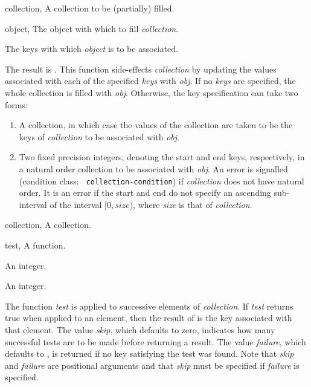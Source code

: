 \begin{optDefinition}
%
\begin{genericargs}
    \item[collection, \classref{collection}] A collection to be (partially) filled.
    \item[object, \classref{object}] The object with which to fill {\em collection}.
    \item[\optional{keys}] The keys with which {\em object\/} is to be
    associated.
\end{genericargs}
%
\result%
The result is \nil.
%
\remarks%
This function side-effects {\em collection\/} by updating the values
associated with each of the specified {\em keys\/} with {\em obj}.  If
no {\em keys\/} are specified, the whole collection is filled with
{\em obj}.  Otherwise, the key specification can take two forms:
%
\begin{enumerate}
    \item A collection, in which case the values of the collection are taken to
    be the keys of {\em collection\/} to be associated with {\em obj}.
    \item Two fixed precision integers, denoting the start and end keys,
    respectively, in a natural order collection to be associated with {\em obj}.
    An error is signalled (condition class: {\tt
        collection-condition}) if {\em
        collection\/} does not have natural order.  It is an error if the start
    and end do not specify an ascending sub-interval of the interval $[0,size)$,
    where {\em size\/} is that of {\em collection}.
\end{enumerate}

%
\begin{genericargs}
    \item[collection, \classref{collection}] A collection.
    \item[test, \classref{function}] A function.
    \item[\optional{skip}] An integer.
    \item[\optional{failure}] An integer.
\end{genericargs}
%
\result%
The function {\em test\/} is applied to successive elements of {\em
    collection}. If {\em test\/} returns true when applied to an element, then the
result of  is the key associated with that element.
%
\remarks%
The value {\em skip\/}, which defaults to zero, indicates how many
successful tests are to be made before returning a result. The value {\em
    failure}, which defaults to \nil, is returned if no key satisfying the
test was found. Note that {\em skip\/} and {\em failure\/} are positional arguments
and that {\em skip\/} must be specified if {\em failure\/} is specified.


\end{optDefinition}
